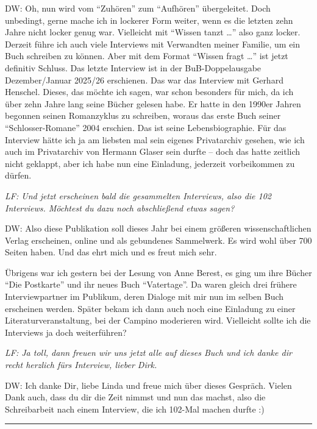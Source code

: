\documentclass[a4paper,
fontsize=11pt,
oneside,
numbers=noperiodatend,
parskip=half-,
bibliography=totoc,
final
]{scrartcl}
\begin{document}
DW: Oh, nun wird vom \enquote{Zuhören} zum \enquote{Aufhören}
übergeleitet. Doch unbedingt, gerne mache ich in lockerer Form weiter,
wenn es die letzten zehn Jahre nicht locker genug war. Vielleicht mit
\enquote{Wissen tanzt \ldots{}} also ganz locker. Derzeit führe ich auch
viele Interviews mit Verwandten meiner Familie, um ein Buch schreiben zu
können. Aber mit dem Format \enquote{Wissen fragt \ldots{}} ist jetzt
definitiv Schluss. Das letzte Interview ist in der BuB-Doppelausgabe
Dezember/Januar 2025/26 erschienen. Das war das Interview mit Gerhard
Henschel. Dieses, das möchte ich sagen, war schon besonders für mich, da
ich über zehn Jahre lang seine Bücher gelesen habe. Er hatte in den
1990er Jahren begonnen seinen Romanzyklus zu schreiben, woraus das erste
Buch seiner \enquote{Schlosser-Romane} 2004 erschien. Das ist seine
Lebensbiographie. Für das Interview hätte ich ja am liebsten mal sein
eigenes Privatarchiv gesehen, wie ich auch im Privatarchiv von Hermann
Glaser sein durfte -- doch das hatte zeitlich nicht geklappt, aber ich
habe nun eine Einladung, jederzeit vorbeikommen zu dürfen.

\emph{LF: Und jetzt erscheinen bald die gesammelten Interviews, also die
102 Interviews. Möchtest du dazu noch abschließend etwas sagen?}

DW: Also diese Publikation soll dieses Jahr bei einem größeren
wissenschaftlichen Verlag erscheinen, online und als gebundenes
Sammelwerk. Es wird wohl über 700 Seiten haben. Und das ehrt mich und es
freut mich sehr.

Übrigens war ich gestern bei der Lesung von Anne Berest, es ging um ihre
Bücher \enquote{Die Postkarte} und ihr neues Buch \enquote{Vatertage}.
Da waren gleich drei frühere Interviewpartner im Publikum, deren Dialoge
mit mir nun im selben Buch erscheinen werden. Später bekam ich dann auch
noch eine Einladung zu einer Literaturveranstaltung, bei der Campino
moderieren wird. Vielleicht sollte ich die Interviews ja doch
weiterführen?

\emph{LF: Ja toll, dann freuen wir uns jetzt alle auf dieses Buch und
ich danke dir recht herzlich fürs Interview, lieber Dirk.}

DW: Ich danke Dir, liebe Linda und freue mich über dieses Gespräch.
Vielen Dank auch, dass du dir die Zeit nimmst und nun das machst, also
die Schreibarbeit nach einem Interview, die ich 102-Mal machen durfte :)

\begin{center}\rule{0.5\linewidth}{0.5pt}\end{center}
\end{document}

